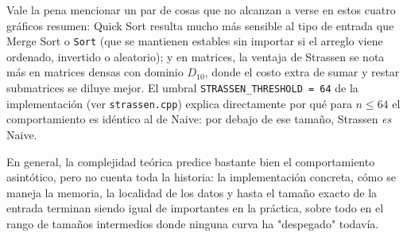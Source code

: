 Vale la pena mencionar un par de cosas que no alcanzan a verse en estos
cuatro gráficos resumen: Quick Sort resulta mucho más sensible al tipo
de entrada que Merge Sort o \texttt{Sort} (que se mantienen
estables sin importar si el arreglo viene ordenado, invertido o
aleatorio); y en matrices, la ventaja de Strassen se nota más en
matrices densas con dominio $D_{10}$, donde el costo extra de sumar y
restar submatrices se diluye mejor. El umbral
\texttt{STRASSEN\_THRESHOLD = 64} de la implementación (ver
\texttt{strassen.cpp}) explica directamente por qué para $n\leq 64$ el
comportamiento es idéntico al de Naive: por debajo de ese tamaño,
Strassen \emph{es} Naive.

En general, la complejidad teórica predice bastante bien el
comportamiento asintótico, pero no cuenta toda la historia: la
implementación concreta, cómo se maneja la memoria, la localidad de
los datos y hasta el tamaño exacto de la entrada terminan siendo
igual de importantes en la práctica, sobre todo en el rango de
tamaños intermedios donde ninguna curva ha "despegado" todavía.